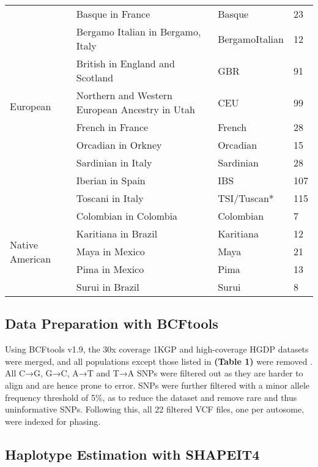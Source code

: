 \documentclass[11pt]{article}
\begin{document}
\begin{table}[htb]
\begin{tabular}{ |p{3cm}||p{8cm}|p{3cm}|p{0.8cm}|  }
    \hline
    \multirow{9}{*}{European}
        &Basque in France & Basque & 23 \\
        &Bergamo Italian in Bergamo, Italy & BergamoItalian & 12 \\
        &British in England and Scotland & GBR & 91 \\
        &Northern and Western European Ancestry in Utah & CEU & 99 \\
        &French in France & French & 28 \\
        &Orcadian in Orkney & Orcadian & 15 \\
        &Sardinian in Italy & Sardinian & 28 \\
        &Iberian in Spain & IBS & 107 \\
        &Toscani in Italy & TSI/Tuscan* & 115 \\
    \hline
    \multirow{5}{*}{Native American}
        &Colombian in Colombia & Colombian & 7 \\
        &Karitiana in Brazil & Karitiana & 12 \\
        &Maya in Mexico & Maya & 21 \\
        &Pima in Mexico & Pima & 13 \\
        &Surui in Brazil & Surui & 8 \\
    \hline
    \end{tabular}
\end{table}





\subsection{Data Preparation with BCFtools}

Using BCFtools v1.9, the 30x coverage 1KGP and high-coverage HGDP datasets were merged, and all populations except those listed in \textbf{(Table 1)} were removed \parencite{Danecek2021}. All C→G, G→C, A→T and T→A SNPs were filtered out as they are harder to align and are hence prone to error. SNPs were further filtered with a minor allele frequency threshold of 5\%, as to reduce the dataset and remove rare and thus uninformative SNPs. Following this, all 22 filtered VCF files, one per autosome, were indexed for phasing. 








\subsection{Haplotype Estimation with SHAPEIT4}
\end{document}
